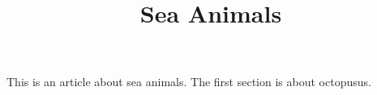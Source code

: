 \documentclass{article}
\title{Sea Animals}
\begin{document}
\maketitle
This is an article about sea animals.
The first section is about octopusus.
\end{document}
